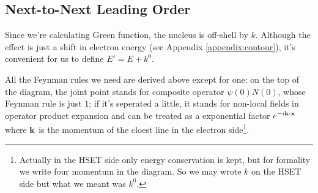 \documentclass[aps,prd,preprint,showkeys,notitlepage,10pt]{revtex4-1}
\newcommand{\vbk}{\vb{k}}
\begin{document}
\subsection{Next-to-Next Leading Order}
Since we're calculating Green function, the nucleus is off-shell by $k$. Although the effect is just a shift in electron energy (see Appendix \ref{appendix:contour}), it's convenient for us to define $E'=E+k^0$.

All the Feynman rules we need are derived above except for one: on the top of the diagram, the joint point stands for composite operator $\psi(0)N(0)$, whose Feynman rule is just $1$; if it's seperated a little, it stands for non-local fields in operator product expansion and can be treated as a exponential factor $e^{-i \vbk \cdot \vb{x}}$ where $\vbk$ is the momentum of the cloest line in the electron side\footnote{Actually in the HSET side only energy conservation is kept, but for formality we write four momentum in the diagram. So we may wrote $k$ on the HSET side but what we meant was $k^0$. }.
\end{document}
